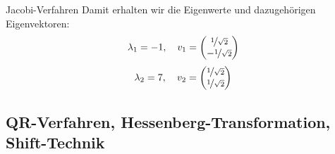 \begin{example}{Jacobi-Verfahren}
    Damit erhalten wir die Eigenwerte und dazugehörigen Eigenvektoren:
    \[
        \lambda_1 = -1, \quad v_1 =
        \begin{pmatrix}
            \nicefrac{1}{\sqrt{2}} \\ -\nicefrac{1}{\sqrt{2}}
        \end{pmatrix}
    \]
    \[
        \lambda_2 = 7, \quad v_2 =
        \begin{pmatrix}
            \nicefrac{1}{\sqrt{2}} \\ \nicefrac{1}{\sqrt{2}}
        \end{pmatrix}
    \]
\end{example}

\subsection{QR-Verfahren, Hessenberg-Transformation, Shift-Technik}


